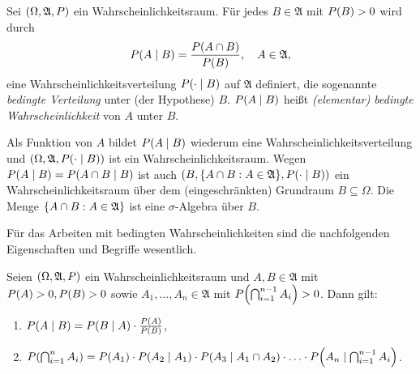 \documentclass{lecture}
\begin{document}
    \begin{definition}
        Sei \(\parentheses*{\Omega, \mathfrak{A}, P}\) ein Wahrscheinlichkeitsraum.
        Für jedes \(B \in \mathfrak{A}\) mit \(P\parentheses*{B} > 0\) wird durch
        \[
            P\parentheses*{A \mid B} = \frac{P\parentheses*{A \cap B}}{P\parentheses*{B}}, \quad A \in \mathfrak{A},
        \]
        eine Wahrscheinlichkeitsverteilung \(P\parentheses*{\cdot \mid B}\) auf \(\mathfrak{A}\) definiert, die sogenannte \emph{bedingte Verteilung} unter (der Hypothese) \(B\).
        \(P\parentheses*{A \mid B}\) heißt \emph{(elementar) bedingte Wahrscheinlichkeit} von \(A\) unter \(B\). 
    \end{definition}

    Als Funktion von \(A\) bildet \(P\parentheses*{A \mid B}\) wiederum eine Wahrscheinlichkeitsverteilung und \(\parentheses*{\Omega, \mathfrak{A}, P\parentheses*{\cdot \mid B}}\) ist ein Wahrscheinlichkeitsraum.
    Wegen \(P\parentheses*{A \mid B} = P\parentheses*{A \cap B \mid B}\) ist auch \(\parentheses*{B, \braces*{A \cap B : A \in \mathfrak{A}}, P\parentheses*{\cdot \mid B}}\) ein Wahrscheinlichkeitsraum über dem (eingeschränkten) Grundraum \(B \subseteq \Omega\).
    Die Menge \(\braces*{A \cap B : A \in \mathfrak{A}}\) ist eine \(\sigma\)-Algebra über \(B\).

    Für das Arbeiten mit bedingten Wahrscheinlichkeiten sind die nachfolgenden Eigenschaften und Begriffe wesentlich.

    \begin{lemma}
        Seien \(\parentheses*{\Omega, \mathfrak{A}, P}\) ein Wahrscheinlichkeitsraum und \(A, B \in \mathfrak{A}\) mit \(P\parentheses*{A} > 0, P\parentheses*{B} > 0\) sowie \(A_1, \ldots, A_n \in \mathfrak{A}\) mit \(P\parentheses*{\bigcap_{i = 1}^{n - 1}A_i} > 0\).
        Dann gilt:
        \begin{enumerate}
            \item \(P\parentheses*{A \mid B} = P\parentheses*{B \mid A} \cdot \frac{P\parentheses*{A}}{P\parentheses*{B}}\),
            \item \(P\parentheses*{\bigcap_{i = 1}^n A_i} = P\parentheses*{A_1} \cdot P\parentheses*{A_2 \mid A_1} \cdot P\parentheses*{A_3 \mid A_1 \cap A_2} \cdot \ldots \cdot P\parentheses*{A_n \mid \bigcap_{i = 1}^{n - 1}A_i}\).
        \end{enumerate}
    \end{lemma}
\end{document}
